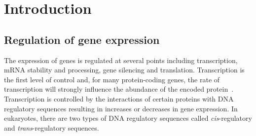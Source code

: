 \documentclass[../main.tex]{subfiles}
\begin{document}
\chapter{Introduction}\label{chapter1}
\section{Regulation of gene expression}\label{chapter1:regulation-of-gene-expression}
The expression of genes is regulated at several points including transcription, mRNA stability and processing, gene silencing and translation.
Transcription is the first level of control and, for many protein\hyp{}coding genes, the rate of transcription will strongly influence the abundance of the encoded protein~\autocite{liuDependencyCellularProtein2016}.
Transcription is controlled by the interactions of certain proteins with DNA regulatory sequences resulting in increases or decreases in gene expression.
In eukaryotes, there are two types of DNA regulatory sequences called \textit{cis}\hyp{}regulatory and \textit{trans}\hyp{}regulatory sequences.
\end{document}
